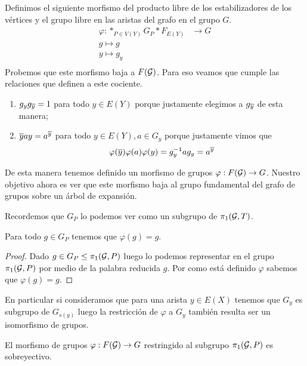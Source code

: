 \documentclass[tesis.tex]{subfiles}
\begin{document}
Definimos el siguiente morfismo del producto libre de los estabilizadores de los vértices y el grupo libre en las aristas del grafo en el grupo $G$.
\begin{align*}
	\varphi: \ast_{P \in V(Y)} G_P \ast F_{E(Y)} &\to G	\\
	g \mapsto g \\
	y \mapsto g_y \\
\end{align*}
Probemos que este morfismo baja a $F({\cal G})$. 
Para eso veamos que cumple las relaciones que definen a este cociente.
\begin{enumerate}
	\item $g_y g_{\overline y} = 1$ para todo $y \in E(Y)$ porque justamente elegimos a $g_{\overline y}$ de esta manera;
	\item $\overline y a y = a^{\overline y}$ para todo $y \in E(Y), a \in G_y$ porque justamente vimos que 
	\[
		\varphi(\overline y) \varphi (a) \varphi(y) = g_y^{-1}ag_y = a^{\overline y}
	\]
\end{enumerate}

De esta manera tenemos definido un morfismo de grupos $\varphi: F({\cal G}) \to G$.
Nuestro objetivo ahora es ver que este morfismo baja al grupo fundamental del grafo de grupos sobre un árbol de expansión.

Recordemos que $G_{P}$ lo podemos ver como un subgrupo de $\pi_1({\cal G},T)$.
\begin{lema}\label{lema_morfismo_pi1_inyectivo}
	Para todo $g \in G_P$ tenemos que $\varphi(g)=g$.
\end{lema}

\begin{proof}
	Dado $g \in G_P \le \pi_1({\cal G}, P)$ luego lo podemos representar en el grupo $\pi_1({\cal G}, P)$ por medio de la palabra reducida $g$.
	Por como está definido $\varphi$ sabemos que $\varphi(g) = g$. 
\end{proof}


\begin{obs}
	En particular si consideramos que para una arista $y \in E(X)$ tenemos que $G_y$ es subgrupo de $G_{s(y)}$ luego la restricción de $\varphi$ a $G_{y}$ también resulta ser un isomorfismo de grupos.
\end{obs}

\begin{prop}\label{prop_morf_grp_restr_sobre}
	El morfismo de grupos $\varphi: F({\cal G}) \to G$ restringido al subgrupo $\pi_1({\cal G}, P)$ es sobreyectivo.
\end{prop}
\end{document}
